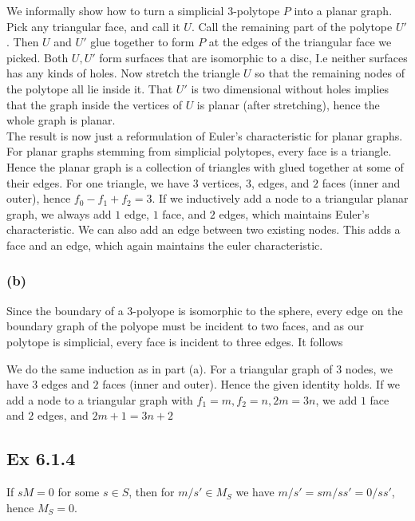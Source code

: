 \documentclass{article}
\theoremstyle{definition}
\begin{document}
We informally show how to turn a simplicial $3$-polytope $P$ into a
planar graph. Pick any triangular face, and call it $U$. Call the remaining
part of the polytope $U'$. Then $U$ and $U'$ glue together to form $P$ at the
edges of the triangular face we picked. Both $U, U'$ form surfaces that are
isomorphic to a disc, I.e neither surfaces has any kinds of holes. Now
stretch the triangle $U$ so that the remaining nodes of the polytope all lie
inside it. That $U'$ is two dimensional without holes implies that the graph
inside the vertices of $U$ is planar (after stretching), hence the whole graph
is planar. \\

The result is now just a reformulation of Euler's characteristic for planar
graphs. For planar graphs stemming from simplicial polytopes, every face is a
triangle. Hence the planar graph is a collection of triangles with glued together
at some of their edges. For one triangle, we have $3$ vertices, $3$, edges, and
$2$ faces (inner and outer), hence $f_0 - f_1 + f_2 = 3$. If we inductively add
a node to a triangular planar graph, we always add $1$ edge, $1$ face, and $2$
edges, which maintains Euler's characteristic. We can also add an edge between 
two existing nodes. This adds a face and an edge, which again maintains the 
euler characteristic.

\subsubsection*{(b)}

Since the boundary of a $3$-polyope is isomorphic to the sphere, every edge on
the boundary graph of the polyope must be incident to two faces, and as our
polytope is simplicial, every face is incident to three edges. It follows 

We do the same induction as in part (a). For a triangular graph of $3$ nodes,
we have $3$ edges and $2$ faces (inner and outer). Hence the given identity
holds. If we add a node to a triangular graph with $f_1 = m, f_2 = n, 2m = 3n$,
we add $1$ face and $2$ edges, and $2m + 1 = 3n + 2$

\subsection*{Ex 6.1.4}

If $sM = 0$ for some $s \in S$, then for $m/s' \in M_{S}$ we have $m/s' =
sm/ss' = 0/ss'$, hence $M_S = 0$. \\
\end{document}
